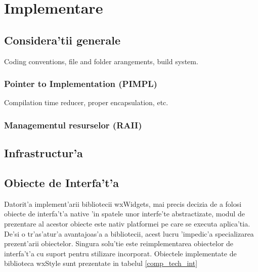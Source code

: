\chapter{Implementare}
\pagestyle{headings}

\section{Considera'tii generale}
Coding conventions, file and folder arangements, build system.

\subsection{Pointer to Implementation (PIMPL)}
Compilation time reducer, proper encapsulation, etc.

\subsection{Managementul resurselor (RAII)}

\section{Infrastructur'a}


\section{Obiecte de Interfa't'a}

Datorit'a implement'arii bibliotecii wxWidgets, mai precis decizia de a folosi obiecte de interfa't'a native 'in spatele unor interfe'te abstractizate, modul de prezentare al acestor obiecte este nativ platformei pe care se executa aplica'tia. De'si o tr'as'atur'a avantajoas'a a bibliotecii, acest lucru 'impedic'a specializarea prezent'arii obiectelor. Singura solu'tie este reimplementarea obiectelor de interfa't'a cu suport pentru stilizare incorporat. Obiectele implementate de biblioteca wxStyle sunt prezentate in tabelul \ref{comp_tech_int}

